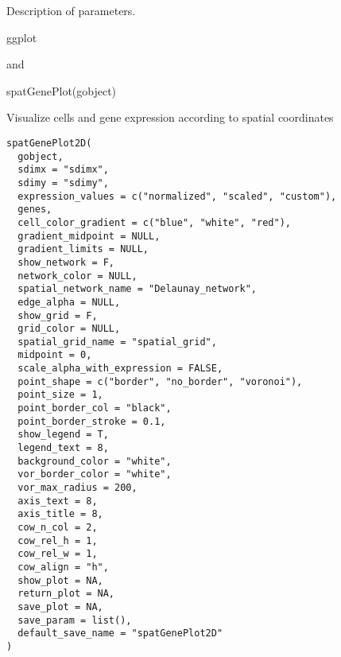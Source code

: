 \documentclass[a4paper]{book}
\begin{document}
%
\begin{Details}\relax
Description of parameters.
\end{Details}
%
\begin{Value}
ggplot
\end{Value}
%
\begin{SeeAlso}\relax
{} and 
\end{SeeAlso}
%
\begin{Examples}
\begin{ExampleCode}
    spatGenePlot(gobject)
\end{ExampleCode}
\end{Examples}
%
\begin{Description}\relax
Visualize cells and gene expression according to spatial coordinates
\end{Description}
%
\begin{Usage}
\begin{verbatim}
spatGenePlot2D(
  gobject,
  sdimx = "sdimx",
  sdimy = "sdimy",
  expression_values = c("normalized", "scaled", "custom"),
  genes,
  cell_color_gradient = c("blue", "white", "red"),
  gradient_midpoint = NULL,
  gradient_limits = NULL,
  show_network = F,
  network_color = NULL,
  spatial_network_name = "Delaunay_network",
  edge_alpha = NULL,
  show_grid = F,
  grid_color = NULL,
  spatial_grid_name = "spatial_grid",
  midpoint = 0,
  scale_alpha_with_expression = FALSE,
  point_shape = c("border", "no_border", "voronoi"),
  point_size = 1,
  point_border_col = "black",
  point_border_stroke = 0.1,
  show_legend = T,
  legend_text = 8,
  background_color = "white",
  vor_border_color = "white",
  vor_max_radius = 200,
  axis_text = 8,
  axis_title = 8,
  cow_n_col = 2,
  cow_rel_h = 1,
  cow_rel_w = 1,
  cow_align = "h",
  show_plot = NA,
  return_plot = NA,
  save_plot = NA,
  save_param = list(),
  default_save_name = "spatGenePlot2D"
)
\end{verbatim}
\end{Usage}
%
\end{document}
